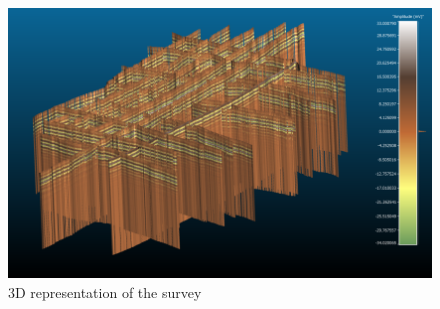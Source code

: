 \begin{figure}[H]
    \centering
    \includegraphics[width=\linewidth]{Images/00_Results/3DCloudPoint.png}
    \caption{3D representation of the survey}
    \label{fig:3D}
\end{figure}

